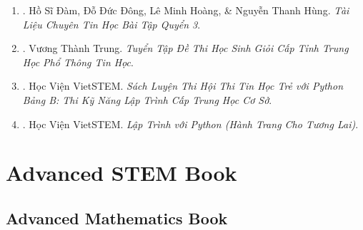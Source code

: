 \documentclass{article}
\begin{document}
\begin{enumerate}
	\item \cite{TL_chuyen_Tin_BT_quyen_3}. Hồ Sĩ Đàm, Đỗ Đức Đông, Lê Minh Hoàng, \& Nguyễn Thanh Hùng. \textit{Tài Liệu Chuyên Tin Học Bài Tập Quyển 3}.\hfill{\sf[reading]}
	\item \cite{Trung_HSG_THPT_Tin}. Vương Thành Trung. \textit{Tuyển Tập Đề Thi Học Sinh Giỏi Cấp Tỉnh Trung Học Phổ Thông Tin Học}.\hfill{\sf[reading]}
	\item \cite{VietSTEM2021}. Học Viện VietSTEM. \textit{Sách Luyện Thi Hội Thi Tin Học Trẻ  với Python Bảng B: Thi Kỹ Năng Lập Trình Cấp Trung Học Cơ Sở}.\hfill{\sf[reading]}
	\item \cite{VietSTEM2022}. Học Viện VietSTEM. \textit{Lập Trình với Python (Hành Trang Cho Tương Lai)}.\hfill{\sf[finished]}
\end{enumerate}


\section{Advanced STEM Book}

\subsection{Advanced Mathematics Book}
\end{document}
